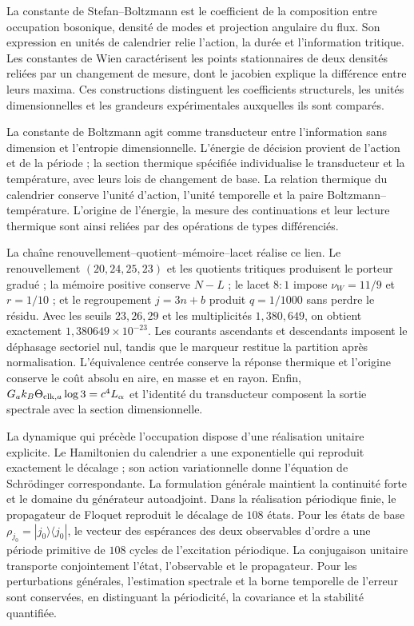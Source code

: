 La constante de Stefan--Boltzmann est le coefficient de la composition
entre occupation bosonique, densité de modes et projection angulaire du
flux. Son expression en unités de calendrier relie l’action,
la durée et l’information tritique. Les constantes de Wien caractérisent
les points stationnaires de deux densités reliées par un changement de
mesure, dont le jacobien explique la différence entre leurs maxima.
Ces constructions distinguent les coefficients structurels, les
unités dimensionnelles et les grandeurs expérimentales auxquelles
ils sont comparés.

La constante de Boltzmann agit comme transducteur entre l’information
sans dimension et l’entropie dimensionnelle. L’énergie de décision provient
de l’action et de la période ; la section thermique spécifiée
individualise le transducteur et la température, avec leurs lois de changement
de base. La relation thermique du calendrier conserve l’unité
d’action, l’unité temporelle et la paire Boltzmann--température.
L’origine de l’énergie, la mesure des continuations et leur lecture
thermique sont ainsi reliées par des opérations de types
différenciés.

La chaîne renouvellement--quotient--mémoire--lacet réalise ce lien. Le renouvellement
$(20,24,25,23)$ et les quotients tritiques produisent le porteur gradué ;
la mémoire positive conserve $N-L$ ; le lacet $8{:}1$ impose
$\nu_W=11/9$ et $r=1/10$ ; et le regroupement $j=3n+b$ produit
$q=1/1000$ sans perdre le résidu. Avec les seuils $23,26,29$ et les
multiplicités $1,380,649$, on obtient exactement
$1{,}380649\times10^{-23}$. Les courants ascendants et descendants
imposent le déphasage sectoriel nul, tandis que le marqueur restitue la
partition après normalisation. L’équivalence centrée conserve la
réponse thermique et l’origine conserve le coût absolu en aire, en masse et en
rayon. Enfin,
$G_a k_B\Theta_{{\rm clk},a}\log3=c^4L_\alpha$ et l’identité du
transducteur composent la sortie spectrale avec la section dimensionnelle.

La dynamique qui précède l’occupation dispose d’une réalisation
unitaire explicite. Le Hamiltonien du calendrier a une exponentielle
qui reproduit exactement le décalage ; son action variationnelle donne
l’équation de Schrödinger correspondante. La formulation générale
maintient la continuité forte et le domaine du générateur autoadjoint.
Dans la réalisation périodique finie, le propagateur de Floquet reproduit
le décalage de \(108\) états. Pour les états de base
\(\rho_{j_0}=|j_0\rangle\langle j_0|\), le vecteur des espérances des
deux observables d’ordre a une période primitive de \(108\) cycles
de l’excitation périodique.
La conjugaison unitaire transporte
conjointement l’état, l’observable et le propagateur. Pour les perturbations
générales, l’estimation spectrale et la borne temporelle de
l’erreur sont conservées, en distinguant la périodicité, la covariance et la stabilité quantifiée.

